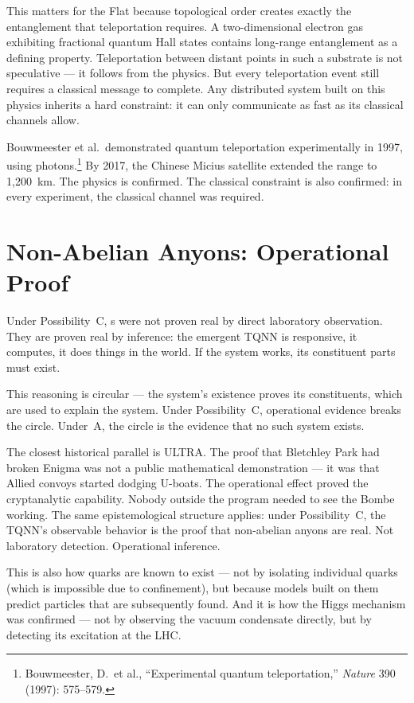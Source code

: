 This matters for the Flat because topological order creates exactly the entanglement that teleportation requires. A two-dimensional electron gas exhibiting fractional quantum Hall states contains long-range entanglement as a defining property. Teleportation between distant points in such a substrate is not speculative --- it follows from the physics. But every teleportation event still requires a classical message to complete. Any distributed system built on this physics inherits a hard constraint: it can only communicate as fast as its classical channels allow.

Bouwmeester et al.\ demonstrated quantum teleportation experimentally in 1997, using photons.\footnote{Bouwmeester, D.\ et al., ``Experimental quantum teleportation,'' \textit{Nature} 390 (1997): 575--579.} By 2017, the Chinese Micius satellite extended the range to 1,200~km. The physics is confirmed. The classical constraint is also confirmed: in every experiment, the classical channel was required.

\section*{Non-Abelian Anyons: Operational Proof}
\label{pos10:non-abelian-anyons-operational-proof}

Under Possibility~C, s were not proven real by direct laboratory observation. They are proven real by inference: the emergent TQNN is responsive, it computes, it does things in the world. If the system works, its constituent parts must exist.

This reasoning is circular --- the system's existence proves its constituents, which are used to explain the system. Under Possibility~C, operational evidence breaks the circle. Under~A, the circle is the evidence that no such system exists.

The closest historical parallel is ULTRA\@. The proof that Bletchley Park had broken Enigma was not a public mathematical demonstration --- it was that Allied convoys started dodging U-boats. The operational effect proved the cryptanalytic capability. Nobody outside the program needed to see the Bombe working. The same epistemological structure applies: under Possibility~C, the TQNN's observable behavior is the proof that non-abelian anyons are real. Not laboratory detection. Operational inference.

This is also how quarks are known to exist --- not by isolating individual quarks (which is impossible due to confinement), but because models built on them predict particles that are subsequently found. And it is how the Higgs mechanism was confirmed --- not by observing the vacuum condensate directly, but by detecting its excitation at the LHC\@.

